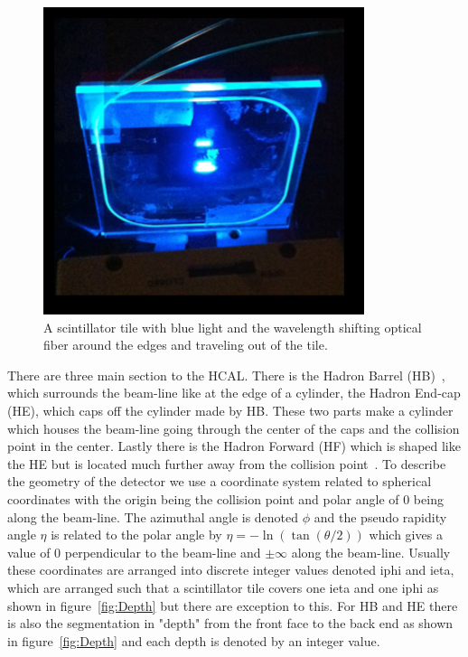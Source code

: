 \begin{figure}
\centering
\includegraphics[width=0.6\linewidth]{Figures/Tile.png}
\caption{A scintillator tile with blue light and the wavelength shifting optical fiber around the edges and traveling out of the tile.}
\label{fig:Tile}
\end{figure}


There are three main section to the HCAL. There is the Hadron Barrel (HB)~\cite{HB}, which surrounds the beam-line like at the edge of a cylinder, the Hadron End-cap (HE), which caps off the cylinder made by HB. These two parts make a cylinder which houses the beam-line going through the center of the caps and the collision point in the center. Lastly there is the Hadron Forward (HF) which is shaped like the HE but is located much further away from the collision point~\cite{HF}. To describe the geometry of the detector we use a coordinate system related to spherical coordinates with the origin being the collision point and polar angle of 0 being along the beam-line. The azimuthal angle is denoted $\phi$ and the pseudo rapidity angle $\eta$ is related to the polar angle by $\eta = -\ln(\tan(\theta/2))$ which gives a value of 0 perpendicular to the beam-line and $\pm\infty$ along the beam-line. Usually these coordinates are arranged into discrete integer values denoted iphi and ieta, which are arranged such that a scintillator tile covers one ieta and one iphi as shown in figure~\ref{fig:Depth} but there are exception to this. For HB and HE there is also the segmentation in "depth" from the front face to the back end as shown in figure~\ref{fig:Depth} and each depth is denoted by an integer value. 



